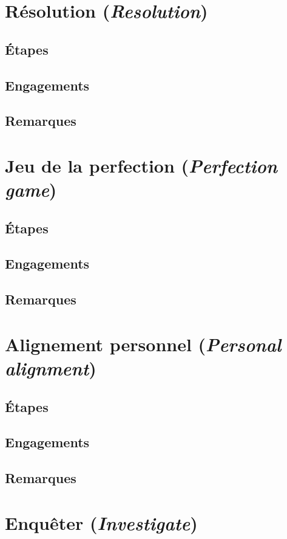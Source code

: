 \documentclass{book}
\begin{document}
\section{Résolution (\emph{Resolution})}
\subsection{Étapes}
\subsection{Engagements}
\subsection{Remarques}

\section{Jeu de la perfection (\emph{Perfection game})}
\subsection{Étapes}
\subsection{Engagements}
\subsection{Remarques}

\section{Alignement personnel (\emph{Personal alignment})}
\subsection{Étapes}
\subsection{Engagements}
\subsection{Remarques}

\section{Enquêter (\emph{Investigate})}
\end{document}
